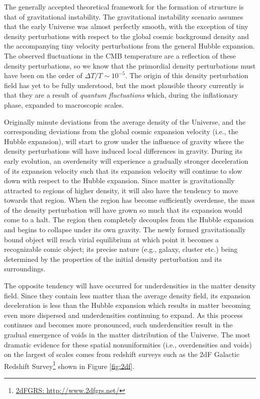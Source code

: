 \documentclass[a4paper,11pt]{article}
\begin{document}
The generally accepted theoretical framework for the formation of structure is that of gravitational instability. The gravitational instability scenario assumes that the early Universe was almost perfectly smooth, with the exception of tiny density perturbations with respect to the global cosmic background density and the accompanying tiny velocity perturbations from the general Hubble expansion. The observed fluctuations in the CMB temperature are a reflection of these density perturbations, so we know that the primordial density perturbations must have been on the order of $\Delta T / T \sim 10^{-5}$. The origin of this density perturbation field has yet to be fully understood, but the most plausible theory currently is that they are a result of \textit{quantum fluctuations} which, during the inflationary phase, expanded to macroscopic scales.

{\noindent}Originally minute deviations from the average density of the Universe, and the corresponding deviations from the global cosmic expansion velocity (i.e., the Hubble expansion), will start to grow under the influence of gravity where the density perturbations will have induced local differences in gravity. During its early evolution, an overdensity will experience a gradually stronger deceleration of its expansion velocity such that its expansion velocity will continue to slow down with respect to the Hubble expansion. Since matter is gravitationally attracted to regions of higher density, it will also have the tendency to move towards that region. When the region has become sufficiently overdense, the mass of the density perturbation will have grown so much that its expansion would come to a halt. The region then completely decouples from the Hubble expansion and begins to collapse under its own gravity. The newly formed gravitationally bound object will reach virial equilibrium at which point it becomes a recognizable comic object; its precise nature (e.g., galaxy, cluster etc.) being determined by the properties of the initial density perturbation and its surroundings.

{\noindent}The opposite tendency will have occurred for underdensities in the matter density field. Since they contain less matter than the average density field, its expansion deceleration is less than the Hubble expansion which results in matter becoming even more dispersed and underdensities continuing to expand. As this process continues and becomes more pronounced, such underdensities result in the gradual emergence of voids in the matter distribution of the Universe. The most dramatic evidence for these spatial nonuniformities (i.e., overdensities and voids) on the largest of scales comes from redshift surveys such as the 2dF Galactic Redshift Survey\footnote{\href{http://www.2dfgrs.net/}{2dFGRS: http://www.2dfgrs.net/}} shown in Figure \ref{fig:2df}.
\end{document}
